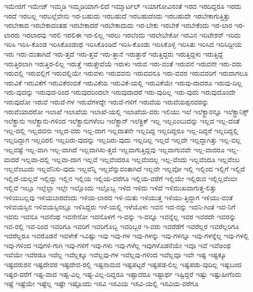 {ಇಮೇಜಿಗೆ
ಇಮೇಜ್
ಇಮ್ಮಡಿ
ಇಮ್ಮಡಿಯಾಗ-ಲಿದೆ
ಇಮ್ಮಾರ್ಟಲ್
ಇಯಾಗೋವಿನಂತೆ
ಇರದ
ಇರದಿದ್ದರೂ
ಇರದು
ಇರದೆ
ಇರಬಲ್ಲ
ಇರಬಲ್ಲೆವೇನು
ಇರ-ಬಹುದು
ಇರಬಹುದೆ
ಇರಬಹುದೆಂದು
ಇರಬಹುದೇ
ಇರಬೇಕಾಗುತ್ತಿತ್ತು
ಇರಬೇಕಾದ
ಇರಬೇಕಾದಂತಹ
ಇರಬೇಕಾದರೆ
ಇರಬೇಕಾದುದು
ಇರ-ಬೇಕು
ಇರಬೇಕೆ
ಇರಬೇಕೆಂದು
ಇರ-ಲಾರ
ಇರ-ಲಾರರು
ಇರಲಾರವು
ಇರಲಿ
ಇರಲಿಈ
ಇರ-ಲಿಲ್ಲ
ಇರಲು
ಇರಲೆಂದು
ಇರಲೇಬೇಕೋ
ಇರವಿನ
ಇರಿಟೇಶನ್
ಇರಿದು
ಇರಿಸಿ
ಇರಿಸಿ-ಕೊಂಡ
ಇರಿಸಿಕೊಂಡಂಥ
ಇರಿಸಿಕೊಂಡಿದೆ
ಇರಿಸಿ-ಕೊಂಡು
ಇರಿಸಿಕೊಳ್ಳಿ
ಇರಿಸಿತು
ಇರಿಸಿದ
ಇರಿಸಿದ್ದೀಯ
ಇರು
ಇರು-ವಂತಾಗಿದೆ
ಇರು-ತ್ತದೆ
ಇರು-ತ್ತವೆ
ಇರು-ತ್ತಾನೆ
ಇರುತ್ತಾರೆ
ಇರುತ್ತಿದ್ದರು
ಇರುತ್ತಿದ್ದಳು
ಇರುತ್ತಿದ್ದೆ
ಇರುತ್ತಿರಲಾಗಿ
ಇರುತ್ತಿರ-ಲಿಲ್ಲ
ಇರುತ್ತೆ
ಇರುತ್ತೇವೆಯೆ
ಇರುಳು
ಇರುವ
ಇರು-ವಂತೆ
ಇರುವನೆ
ಇರುವನೇ
ಇರು-ವರು
ಇರುವಲ್ಲಿ
ಇರುವಲ್ಲಿಗೆ
ಇರುವಲ್ಲಿಯೇ
ಇರುವಳು
ಇರುವವನು
ಇರುವವನೂ
ಇರು-ವವರ
ಇರುವವರಿಗೆ
ಇರುವಾಗಲೂ
ಇರುವಿಕೆ
ಇರುವಿಕೆಗೆ
ಇರುವಿಕೆನಂಬಿಕೆ
ಇರುವಿಕೆಯ
ಇರುವಿಕೆ-ಯಲ್ಲಿ
ಇರುವಿಕೆಯೇ
ಇರುವು-ದಾದರೂ
ಇರುವು-ದಿಲ್ಲ
ಇರು-ವುದನ್ನು
ಇರುವುದ-ರಿಂದ
ಇರುವುದರಿಂದಲೇ
ಇರುವುದಾದರೆ
ಇರು-ವುದಿಲ್ಲ
ಇರು-ವುದು
ಇರುವುದೊಂದೇ
ಇರುವುದೋ
ಇರುವೆ
ಇರುವೆ-ಗಳ
ಇರುವೆಗಳದ್ದೇ
ಇರುವೆ-ಗಳಿಗೆ
ಇರುವೆಯ
ಇರುವೆಯಪ್ಪನವರನ್ನು
ಇರುವೆಯಾದರೋ
ಇಲಾಖೆ
ಇಲಾಖೆಯ
ಇಲಾಖೆ-ಯಲ್ಲಿ
ಇಲಾಖೆಯ-ವರು
ಇಲಿಯು
ಇಲೆ
ಇಲೆಕ್ಟ್ರಾನನ್ನೂ
ಇಲೆಕ್ಟ್ರಾನಿಕ್ಸ್
ಇಲೆಕ್ಟ್ರಾನು
ಇಲೆಕ್ಟ್ರಾನು-ಗಳಿಂದ
ಇಲೆಕ್ಟ್ರಾನುಗಳೆಂಬ
ಇಲೆಕ್ಟ್ರಾನ್
ಇಲೆಕ್ಟ್ರಿಕ್
ಇಲ್ಲ
ಇಲ್ಲಎಂಬುದನ್ನು
ಇಲ್ಲದ
ಇಲ್ಲ-ದಂತೆ
ಇಲ್ಲ-ದಲ್ಲಿ
ಇಲ್ಲದವನು
ಇಲ್ಲದ-ವರು
ಇಲ್ಲ-ದಾಗ
ಇಲ್ಲದಾತನೇ
ಇಲ್ಲದಿದ್ದ
ಇಲ್ಲದಿದ್ದರೂ
ಇಲ್ಲ-ದಿದ್ದರೆ
ಇಲ್ಲದಿದ್ದಲ್ಲಿ
ಇಲ್ಲದಿದ್ದಾಗ
ಇಲ್ಲದಿರಲಿ
ಇಲ್ಲದಿರು-ವುದನ್ನು
ಇಲ್ಲದಿರು-ವುದು
ಇಲ್ಲದಿಲ್ಲ
ಇಲ್ಲದೆ
ಇಲ್ಲದೇ
ಇಲ್ಲದ್ದಾಗಿತ್ತು
ಇಲ್ಲ-ವಲ್ಲ
ಇಲ್ಲವಷ್ಟೆ
ಇಲ್ಲ-ವಾಗಿ
ಇಲ್ಲ-ವಾಗಿದೆ
ಇಲ್ಲವಾಗಿಸು-ತ್ತದೆ
ಇಲ್ಲವಾಗುತ್ತಿದ್ದವು
ಇಲ್ಲವಾಗುವವೇ
ಇಲ್ಲ-ವಾದರೂ
ಇಲ್ಲ-ವಾದರೆ
ಇಲ್ಲವಾ-ದಲ್ಲಿ
ಇಲ್ಲವಾ-ದಾಗ
ಇಲ್ಲವೆ
ಇಲ್ಲವೆಂದರೂ
ಇಲ್ಲವೆಂದಲ್ಲ
ಇಲ್ಲ-ವೆಂದು
ಇಲ್ಲವೆಂದೂ
ಇಲ್ಲವೆಂಬ
ಇಲ್ಲವೆಂಬುದು
ಇಲ್ಲವೆನಿಸು-ವುದು
ಇಲ್ಲವೆನ್ನಿ
ಇಲ್ಲವೆನ್ನುವಂತಾಗಿದೆ
ಇಲ್ಲವೇ
ಇಲ್ಲವೋ
ಇಲ್ಲಿ
ಇಲ್ಲಿಂದ
ಇಲ್ಲಿಗೆ
ಇಲ್ಲಿದೆ
ಇಲ್ಲಿದೆ-ಯಲ್ಲವೆ
ಇಲ್ಲಿದ್ದು
ಇಲ್ಲಿನ
ಇಲ್ಲಿಯ
ಇಲ್ಲಿಯ-ವರೆಗೂ
ಇಲ್ಲಿಯ-ವರೆಗೆ
ಇಲ್ಲಿಯೇ
ಇಲ್ಲಿರುವ
ಇಲ್ಲಿಲ್ಲವೆಂಬೀ
ಇಲ್ಲಿವೆ
ಇಲ್ಲೂ
ಇಲ್ಲೆಲ್ಲಾ
ಇಲ್ಲೇ
ಇಲ್ಲೊಂದು
ಇಲ್ಲೊಬ್ಬ
ಇಳಿದ
ಇಳಿದು
ಇಳಿದೆ
ಇಳಿಮುಖವಾಗುತ್ತ-ಲಿತ್ತು
ಇಳಿಯಬಲ್ಲವು
ಇಳಿಯಬಾರದೆಂದು
ಇಳಿಯ-ಲಾರದ
ಇಳಿ-ಯಿತು
ಇಳಿಯುತ್ತ
ಇಳಿಯು-ತ್ತಿದ್ದಾಗ
ಇಳಿಯು-ವಂತೆ
ಇಳಿವಯಸ್ಸಿನ
ಇಳಿವಯಸ್ಸಿನಲ್ಲೂ
ಇಳಿಸಿದ್ದರು
ಇಳೆ-ಯಲ್ಲಿ
ಇಳೆಯೊಳು
ಇವನ
ಇವ-ನನ್ನು
ಇವನಿ-ಗಿಂತ
ಇವ-ನಿಗೆ
ಇವನು
ಇವನೂ
ಇವನೆಂಥ
ಇವನೇನೋ
ಇವನೊಳಗೆ
ಇ-ವನ್ನು
ಇ-ವನ್ನೂ
ಇವನ್ನೆಲ್ಲ
ಇವರ
ಇವರದೇ
ಇವರನ್ನು
ಇವ-ರಲ್ಲಿ
ಇವ-ರಿಂದ
ಇವರಿಗೂ
ಇವರಿಗೆ
ಇವರಿಗೊಬ್ಬ
ಇವರಿಬ್ಬರ
ಇ-ವರು
ಇವರೆಡೆಗೆ
ಇವರೆಲ್ಲರ
ಇವರೆಲ್ಲರಿಗೂ
ಇವರೆಲ್ಲರೂ
ಇವರೊಡನೆ
ಇವಳೇಕೆ
ಇವಿಷ್ಟು
ಇವು
ಇವು-ಗಳ
ಇವು-ಗಳನ್ನು
ಇವು-ಗಳನ್ನೂ
ಇವು-ಗಳನ್ನೆಲ್ಲ
ಇವು-ಗಳಲ್ಲಿ
ಇವು-ಗಳಿಂದ
ಇವುಗಳಿ-ಗಾಗಿ
ಇವು-ಗಳಿಗೆ
ಇವು-ಗಳು
ಇವು-ಗಳೆಲ್ಲ
ಇವುಗಳೊಡನೆಯೇ
ಇವೂ
ಇವೆ
ಇವೆಅಂಥ
ಇವೆಯೇ
ಇವೆರಡೂ
ಇವೆಲ್ಲ
ಇವೆಲ್ಲಕ್ಕೂ
ಇವೆಲ್ಲವು-ಗಳ
ಇವೆಲ್ಲವು-ಗಳಿಂದ
ಇವೆಲ್ಲವೂ
ಇವೇ
ಇಷ್ಟ
ಇಷ್ಟಕ್ಕೂ
ಇಷ್ಟದರುಶನ
ಇಷ್ಟದೇವರ
ಇಷ್ಟದೇವ-ರಲ್ಲಿ
ಇಷ್ಟನಾಮದ
ಇಷ್ಟಪಟ್ಟರೆ
ಇಷ್ಟಪಡ-ಲಿಲ್ಲ
ಇಷ್ಟಪಡು-ವುದಿಲ್ಲ
ಇಷ್ಟಬಂದ
ಇಷ್ಟರ-ವರೆಗೆ
ಇಷ್ಟ-ವಾದ
ಇಷ್ಟ-ವಿಲ್ಲ
ಇಷ್ಟ-ವಿಲ್ಲ-ದಿದ್ದರೂ
ಇಷ್ಟಾದರೂ
ಇಷ್ಟಾರ್ಥ
ಇಷ್ಟಿದ್ದರೆ
ಇಷ್ಟು
ಇಷ್ಟುಹೀಗೆಂದು
ಇಷ್ಟೆ
ಇಷ್ಟೆಯೇ
ಇಷ್ಟೆಲ್ಲ
ಇಷ್ಟೇ
ಇಷ್ಟೊಂದು
ಇಸವಿ
ಇಸವಿಯ
ಇಸವಿ-ಯಲ್ಲಿ
ಇಸವಿಯ-ವರೆಗೂ
}
